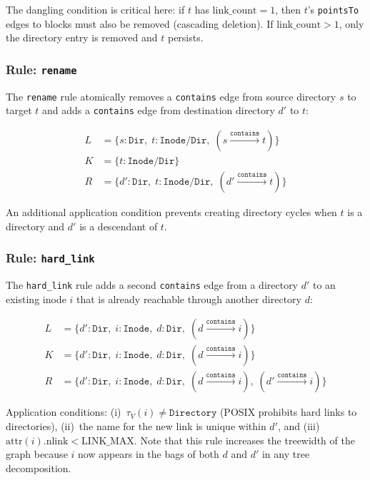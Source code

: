 \documentclass[11pt,a4paper]{article}
\theoremstyle{definition}
\theoremstyle{remark}
\begin{document}
The dangling condition is critical here: if $t$ has
$\mathrm{link\_count} = 1$, then $t$'s \texttt{pointsTo} edges to
blocks must also be removed (cascading deletion). If
$\mathrm{link\_count} > 1$, only the directory entry is removed and
$t$ persists.

\subsubsection{Rule: \texttt{rename}}

The \texttt{rename} rule atomically removes a \texttt{contains} edge
from source directory $s$ to target $t$ and adds a \texttt{contains}
edge from destination directory $d'$ to $t$:

\begin{align*}
L &= \{s : \texttt{Dir},\; t : \texttt{Inode/Dir},\;
       (s \xrightarrow{\texttt{contains}} t)\} \\
K &= \{t : \texttt{Inode/Dir}\} \\
R &= \{d' : \texttt{Dir},\; t : \texttt{Inode/Dir},\;
       (d' \xrightarrow{\texttt{contains}} t)\}
\end{align*}

An additional application condition prevents creating directory cycles
when $t$ is a directory and $d'$ is a descendant of $t$.

\subsubsection{Rule: \texttt{hard\_link}}

The \texttt{hard\_link} rule adds a second \texttt{contains} edge
from a directory $d'$ to an existing inode $i$ that is already
reachable through another directory $d$:

\begin{align*}
L &= \{d' : \texttt{Dir},\; i : \texttt{Inode},\;
       d : \texttt{Dir},\;
       (d \xrightarrow{\texttt{contains}} i)\} \\
K &= \{d' : \texttt{Dir},\; i : \texttt{Inode},\;
       d : \texttt{Dir},\;
       (d \xrightarrow{\texttt{contains}} i)\} \\
R &= \{d' : \texttt{Dir},\; i : \texttt{Inode},\;
       d : \texttt{Dir},\;
       (d \xrightarrow{\texttt{contains}} i),\;
       (d' \xrightarrow{\texttt{contains}} i)\}
\end{align*}

Application conditions: (i)~$\tau_V(i) \neq \texttt{Directory}$
(POSIX prohibits hard links to directories), (ii)~the name for the
new link is unique within $d'$, and (iii)~$\mathrm{attr}(i).\mathrm{nlink}
< \mathrm{LINK\_MAX}$. Note that this rule increases the treewidth
of the graph because $i$ now appears in the bags of both $d$ and
$d'$ in any tree decomposition.
\end{document}
